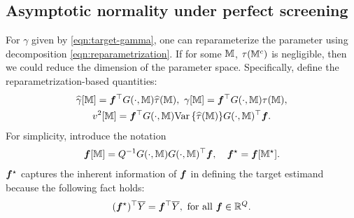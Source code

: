 \documentclass[12pt]{article}
\begin{document}
\subsection{Asymptotic normality under perfect screening}


For $\gamma$ given by \eqref{eqn:target-gamma}, one can reparameterize the parameter using  decomposition \eqref{eqn:reparametrization}. If for some ${\mathbb{M}}$, $\tau({\mathbb{M}}^c)$ is negligible, then we could reduce the dimension of the parameter space. Specifically,  define the reparametrization-based quantities:
\begin{gather*}
    {\widehat{\gamma}}[{{\mathbb{M}}}] = {\boldsymbol{f}}^\top G(\cdot, {{\mathbb{M}}}) {\widehat{\tau}}({{\mathbb{M}}}), ~\gamma[{\mathbb{M}}] = {\boldsymbol{f}}^\top G(\cdot,{\mathbb{M}})\tau({\mathbb{M}}), \\
    v^2[{\mathbb{M}}] =  {\boldsymbol{f}}^\top G(\cdot,{\mathbb{M}}){\operatorname{Var}\left\{{\widehat{\tau}}({\mathbb{M}})\right\}} G(\cdot,{\mathbb{M}})^\top{\boldsymbol{f}}.
\end{gather*}
For simplicity, introduce the notation
\begin{align} \label{eqn:bsf-M}
{\boldsymbol{f}}[{\mathbb{M}}] = Q^{-1}G(\cdot,{\mathbb{M}})G(\cdot,{\mathbb{M}})^\top{\boldsymbol{f}}, \quad {\boldsymbol{f}}^\star = {\boldsymbol{f}}[{\mathbb{M}}^\star].
\end{align}
${\boldsymbol{f}}^\star$ captures the inherent information of ${\boldsymbol{f}}$ in defining the target estimand because the following fact holds:
\begin{align*}
    ({\boldsymbol{f}}^{\star})^{\top}\overline{Y} = {\boldsymbol{f}}^\top\overline{Y}, ~\text{for all } {\boldsymbol{f}}\in{\mathbb{R}}^Q.
\end{align*}

\end{document}
